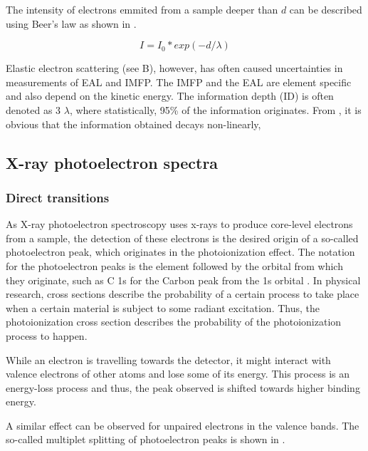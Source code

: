 The intensity of electrons emmited from a sample deeper than $d$ can be described using Beer's law as shown in .

\begin{equation}
\label{beerslaw}
    I = I_{0} * exp(-d/\lambda)
\end{equation}

Elastic electron scattering (see  B), however, has often caused uncertainties in measurements of EAL and IMFP. The IMFP and the EAL are element specific and also depend on the kinetic energy. 
The information depth (ID) is often denoted as 3 $\lambda$, where statistically, 95\% of the information originates. From , it is obvious that the information obtained decays non-linearly, 

\subsection{X-ray photoelectron spectra} %
\subsubsection{Direct transitions}
As X-ray photoelectron spectroscopy uses x-rays to produce core-level electrons from a sample, the detection of these electrons is the desired origin of a so-called photoelectron peak, which originates in the photoionization effect. The notation for the photoelectron peaks is the element followed by the orbital from which they originate, such as C 1s for the Carbon peak from the 1s orbital \cite{stevie_introduction_2020}. In physical research, cross sections describe the probability of a certain process to take place when a certain material is subject to some radiant excitation. Thus, the photoionization cross section describes the probability of the photoionization process to happen. 

While an electron is travelling towards the detector, it might interact with valence electrons of other atoms and lose some of its energy. This process is an energy-loss process and thus, the peak observed is shifted towards higher binding energy.

A similar effect can be observed for unpaired electrons in the valence bands. The so-called multiplet splitting of photoelectron peaks is shown in .

